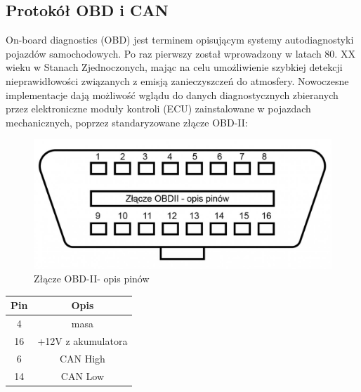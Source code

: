 \documentclass[10pt,a4paper]{article}
\begin{document}
		\subsection{Protokół OBD i CAN}
		On-board diagnostics (OBD) jest terminem opisującym systemy autodiagnostyki pojazdów samochodowych. Po raz pierwszy został wprowadzony w latach 80. XX wieku w Stanach Zjednoczonych, mając na celu umożliwienie szybkiej detekcji nieprawidłowości związanych z emisją zanieczyszczeń do atmosfery.  Nowoczesne implementacje dają możliwość wglądu do danych diagnostycznych zbieranych przez elektroniczne moduły kontroli (ECU) zainstalowane w pojazdach mechanicznych, poprzez standaryzowane złącze OBD-II:
		\begin{figure}[H]
			\centering
			\includegraphics[width=0.7\linewidth]{obd2}
			\caption[Złącze OBD-II]{Złącze OBD-II- opis pinów}
			\label{fig:obd2}
		\end{figure}
		\begin{table}[H]
		\begin{tabular}{|c|c|}
			\hline
			Pin & Opis \\
			\hline
			4 & masa \\
			\hline
			16 & +12V z akumulatora \\
				\hline
			6 & CAN High \\			
				\hline
			14 & CAN Low \\			
			\hline
		\end{tabular}
		\end{table}
		
\end{document}
